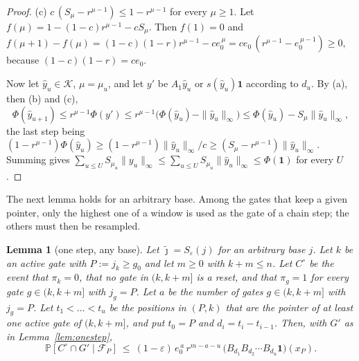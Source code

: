 \documentclass[11pt]{amsart}
\newtheorem{lemma}[theorem]{Lemma}
\theoremstyle{definition}
\theoremstyle{remark}
\newcommand{\eps}{\varepsilon}
\newcommand{\jt}{\tilde{\jmath}}
\newcommand{\PP}{\mathbb{P}}
\newcommand{\cF}{\mathcal{F}}
\begin{document}
\begin{proof}
(c) $c\,(S_\mu-r^{\mu-1})\le1-r^{\mu-1}$ for every $\mu\ge1$. Let
$f(\mu)=1-(1-c)r^{\mu-1}-cS_\mu$. Then $f(1)=0$ and
$f(\mu+1)-f(\mu)=(1-c)(1-r)r^{\mu-1}-ce_0^{\,\mu}=ce_0\,(r^{\mu-1}-e_0^{\,\mu-1})\ge0$, because
$(1-c)(1-r)=ce_0$.

Now let $\hat y_u\in\mathcal K$, $\mu=\mu_u$, and let $y'$ be $A_1\hat y_u$ or
$s(\hat y_u)\mathbf 1$ according to $d_u$. By (a), then (b) and (c),
\[
\Phi(\hat y_{u+1})\le r^{\mu-1}\Phi(y')\le r^{\mu-1}\bigl(\Phi(\hat y_u)-\|\hat y_u\|_\infty\bigr)
\le\Phi(\hat y_u)-S_\mu\|\hat y_u\|_\infty ,
\]
the last step being
$(1-r^{\mu-1})\Phi(\hat y_u)\ge(1-r^{\mu-1})\|\hat y_u\|_\infty/c\ge(S_\mu-r^{\mu-1})\|\hat y_u\|_\infty$.
Summing gives
$\sum_{u\le U}S_{\mu_u}\|y_u\|_\infty\le\sum_{u\le U}S_{\mu_u}\|\hat y_u\|_\infty\le\Phi(\mathbf 1)$
for every $U$.
\end{proof}

The next lemma holds for an arbitrary base. Among the gates that keep a given pointer, only the
highest one of a window is used as the gate of a chain step; the others must then be resampled.

\begin{lemma}[one step, any base]\label{lem:ordstep}
Let $\jt=S_\eps(j)$ for an arbitrary base $j$. Let $k$ be an active gate with $P:=j_k\ge g_0$ and
let $m\ge0$ with $k+m\le n$. Let $C^{\circ}$ be the event that $\pi_k=0$, that no gate in
$(k,k+m]$ is a reset, and that $\pi_g=1$ for every gate $g\in(k,k+m]$ with $j_g=P$. Let $a$ be the
number of gates $g\in(k,k+m]$ with $j_g=P$. Let $t_1<\dots<t_u$ be the positions in $(P,k)$ that
are the pointer of at least one active gate of $(k,k+m]$, and put $t_0=P$ and $d_i=t_i-t_{i-1}$.
Then, with $G'$ as in Lemma~\ref{lem:onestep},
\[
\PP[C^{\circ}\cap G'\mid\cF_P]\ \le\ (1-\eps)\,e_0^{\,a}\,r^{m-a-u}\,\bigl(B_{d_1}B_{d_2}\cdots B_{d_u}\mathbf 1\bigr)(x_P).
\]
\end{lemma}
\end{document}

